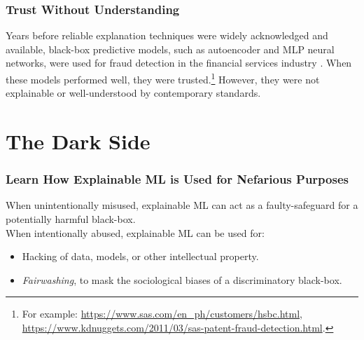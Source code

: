 \documentclass[11pt,
               aspectratio=169,
               hyperref={colorlinks}
               ]{beamer}
\begin{document}
	\begin{frame}
	
		\frametitle{Trust Without Understanding}
		
		Years before reliable explanation techniques were widely acknowledged and available, black-box predictive models, such as autoencoder and MLP neural networks, were used for fraud detection in the financial services industry \cite{gopinathan1998fraud}. When these models performed well, they were trusted.\footnote{For example: \url{https://www.sas.com/en_ph/customers/hsbc.html}, \url{https://www.kdnuggets.com/2011/03/sas-patent-fraud-detection.html}.} However, they were not explainable or well-understood by contemporary standards.  

	\end{frame}


	\section{The Dark Side}

	\begin{frame}
	
		\frametitle{Learn How Explainable ML is Used for Nefarious Purposes}	
		
		When unintentionally misused, explainable ML can act as a faulty-safeguard for a potentially harmful black-box.\\
		\vspace{10pt}
		When intentionally abused, explainable ML can be used for: 
		\begin{itemize}
			\item Hacking of data, models, or other intellectual property.
			\item \textit{Fairwashing}, to mask the sociological biases of a discriminatory black-box.
		\end{itemize}
	
	\end{frame}
\end{document}

